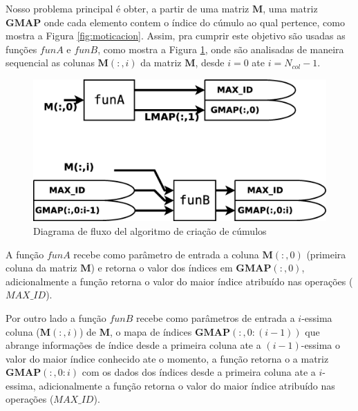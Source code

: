 \documentclass[a4paper,10pt]{article}
\begin{document}
Nosso problema principal é obter, a partir de uma matriz $\mathbf{M}$, 
 uma matriz $\mathbf{GMAP}$ onde cada elemento contem
o índice do cúmulo ao qual pertence, como mostra a Figura \ref{fig:moticacion}.
Assim, pra cumprir este objetivo são usadas as funções $funA$ e $funB$, como mostra  a
Figura \ref{fig:modelocumulos}, onde são analisadas de maneira sequencial as colunas $\mathbf{M}(:,i)$ da
matriz $\mathbf{M}$, desde $i=0$ ate $i=N_{col}-1$.
\begin{figure}[!htb]
\centering
\includegraphics[scale=0.25]{DiagramaCompleto.eps}
\caption{Diagrama de fluxo del algoritmo de criação de cúmulos }
\label{fig:modelocumulos}
\end{figure}

A função $funA$ recebe como parâmetro de entrada a coluna $\mathbf{M}(:,0)$
(primeira coluna da matriz $\mathbf{M}$)
e retorna o valor dos índices em $\mathbf{GMAP}(:,0)$,
adicionalmente a função retorna o valor do maior índice atribuído nas operações ($MAX\_ID$).

Por outro lado a função $funB$ recebe como parâmetros de entrada a $i$-essima 
coluna ($\mathbf{M}(:,i)$) de $\mathbf{M}$, o mapa de índices $\mathbf{GMAP}(:,0:(i-1))$
que abrange informações de índice desde a primeira coluna ate a $(i-1)$-essima 
o valor do maior índice conhecido ate o momento, a função retorna
o a matriz $\mathbf{GMAP}(:,0:i)$ com os dados dos índices desde a primeira coluna ate a $i$-essima,
adicionalmente a função retorna o valor do maior índice atribuído nas operações ($MAX\_ID$).
\end{document}
